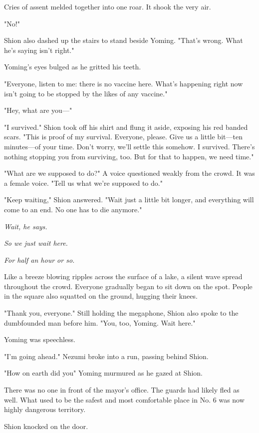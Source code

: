 Cries of assent melded together into one roar. It shook the very air.

"No!"

Shion also dashed up the stairs to stand beside Yoming. "That's wrong.
What he's saying isn't right."

Yoming's eyes bulged as he gritted his teeth.

"Everyone, listen to me: there is no vaccine here. What's happening
right now isn't going to be stopped by the likes of any vaccine."

"Hey, what are you---"

"I survived." Shion took off his shirt and flung it aside, exposing his
red banded scars. "This is proof of my survival. Everyone, please. Give
us a little bit---ten minutes---of your time. Don't worry, we'll settle this
somehow. I survived. There's nothing stopping you from surviving, too.
But for that to happen, we need time."

\mybreak

"What are we supposed to do?" A voice questioned weakly from the crowd.
It was a female voice. "Tell us what we're supposed to do."

"Keep waiting," Shion answered. "Wait just a little bit longer, and
everything will come to an end. No one has to die anymore."

\emph{Wait, he says.}

\emph{So we just wait here.}

\emph{For half an hour or so.}

Like a breeze blowing ripples across the surface of a lake, a silent
wave spread throughout the crowd. Everyone gradually began to sit down
on the spot. People in the square also squatted on the ground, hugging
their knees.

"Thank you, everyone." Still holding the megaphone, Shion also spoke to
the dumbfounded man before him. "You, too, Yoming. Wait here."

Yoming was speechless.

"I'm going ahead." Nezumi broke into a run, passing behind Shion.

"How on earth did you\el " Yoming murmured as he gazed at Shion.

\myspace

There was no one in front of the mayor's office. The guards had likely
fled as well. What used to be the safest and most comfortable place in
No. 6 was now highly dangerous territory.

Shion knocked on the door.


